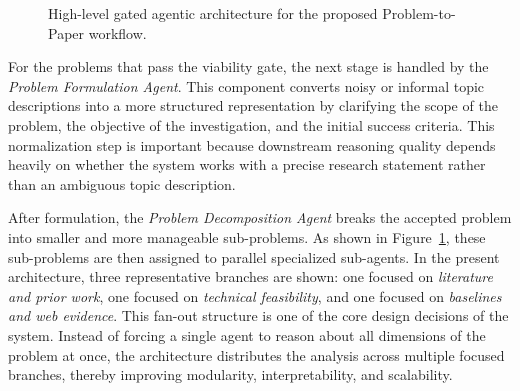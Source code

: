 \documentclass[11pt,a4paper]{article}
\begin{document}
\begin{figure}[t]
\caption{High-level gated agentic architecture for the proposed Problem-to-Paper workflow.}
\label{fig:architecture}
\end{figure}

For the problems that pass the viability gate, the next stage is handled by the \emph{Problem Formulation Agent}. This component converts noisy or informal topic descriptions into a more structured representation by clarifying the scope of the problem, the objective of the investigation, and the initial success criteria. This normalization step is important because downstream reasoning quality depends heavily on whether the system works with a precise research statement rather than an ambiguous topic description.

After formulation, the \emph{Problem Decomposition Agent} breaks the accepted problem into smaller and more manageable sub-problems. As shown in Figure~\ref{fig:architecture}, these sub-problems are then assigned to parallel specialized sub-agents. In the present architecture, three representative branches are shown: one focused on \emph{literature and prior work}, one focused on \emph{technical feasibility}, and one focused on \emph{baselines and web evidence}. This fan-out structure is one of the core design decisions of the system. Instead of forcing a single agent to reason about all dimensions of the problem at once, the architecture distributes the analysis across multiple focused branches, thereby improving modularity, interpretability, and scalability.
\end{document}
